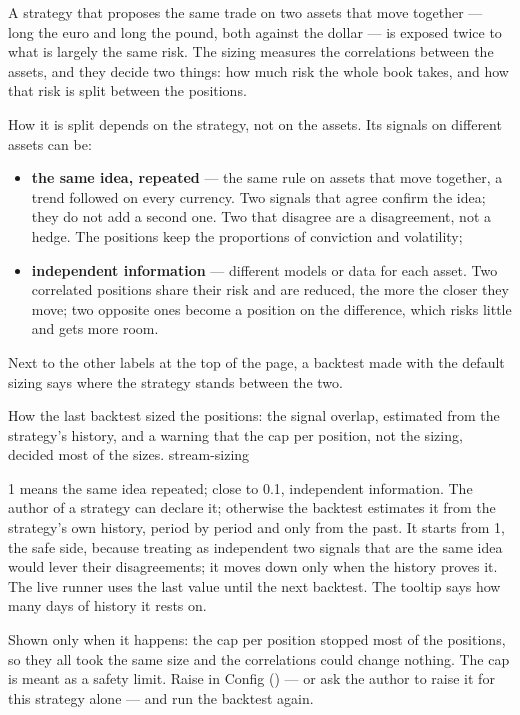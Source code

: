 A strategy that proposes the same trade on two assets that move together ---
long the euro and long the pound, both against the dollar --- is exposed
twice to what is largely the same risk. The sizing measures the correlations
between the assets, and they decide two things: how much risk the whole book
takes, and how that risk is split between the positions.

How it is split depends on the strategy, not on the assets. Its signals on
different assets can be:

\begin{itemize}
  \item \textbf{the same idea, repeated} --- the same rule on assets that
    move together, a trend followed on every currency. Two signals that
    agree confirm the idea; they do not add a second one. Two that disagree
    are a disagreement, not a hedge. The positions keep the proportions of
    conviction and volatility;
  \item \textbf{independent information} --- different models or data for
    each asset. Two correlated positions share their risk and are reduced,
    the more the closer they move; two opposite ones become a position on
    the difference, which risks little and gets more room.
\end{itemize}

\noindent
Next to the other labels at the top of the page, a backtest made with the
default sizing says where the strategy stands between the two.

  {How the last backtest sized the positions: the signal overlap, estimated
   from the strategy's history, and a warning that the cap per position, not
   the sizing, decided most of the sizes.}
  {stream-sizing}

\begin{description}[leftmargin = 1.4em, style = nextline, itemsep = 4pt]
  \item[\voce{Signal overlap 0.27 · estimated}] \num{1} means the same idea
    repeated; close to \num{0.1}, independent information. The author of a
    strategy can declare it; otherwise the backtest estimates it from the
    strategy's own history, period by period and only from the past. It
    starts from \num{1}, the safe side, because treating as independent two
    signals that are the same idea would lever their disagreements; it moves
    down only when the history proves it. The live runner uses the last value
    until the next backtest. The tooltip says how many days of history it
    rests on.
  \item[\voce{Cap 5\% sets 82\% of sizes}] Shown only when it happens: the
    cap per position stopped most of the positions, so they all took the same
    size and the correlations could change nothing. The cap is meant as a
    safety limit. Raise  in Config
    () --- or ask the author to raise it for this strategy
    alone --- and run the backtest again.
\end{description}

